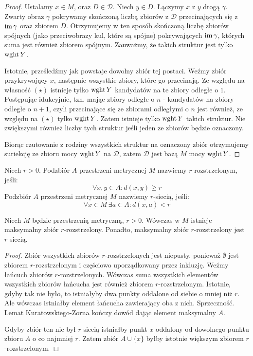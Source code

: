 \begin{lem}
\begin{proof}
    Ustalamy $x \in M$, oraz $D \in \mathcal D$. Niech $y \in D$. Łączymy $x$ z $y$ drogą $\gamma$. Zwarty obraz $\gamma$ pokrywamy skończoną liczbą zbiorów z $\mathcal D$ przecinających się z $\operatorname{im}\gamma$ oraz zbiorem $D$. Otrzymujemy w ten sposób skończoną liczbę zbiorów spójnych (jako przeciwobrazy kul, które są spójne) pokrywających $\operatorname{im}\gamma$, których suma jest również zbiorem spójnym. Zauważmy, że takich struktur jest tylko $\operatorname{wght} Y$. 
    
    Istotnie, prześledźmy jak powstaje dowolny zbiór tej postaci. Weźmy zbiór przykrywający $x$, następnie wszystkie zbiory, które go przecinają. Ze względu na własność $(\star)$ istnieje tylko $\operatorname{wght} Y$ kandydatów na te zbiory odległe o $1$. Postępując idukcyjnie, tzn. mając zbiory odległe o $n$ - kandydatów na zbiory odległe o $n+1$, czyli przecinające się ze zbiorami odległymi o $n$ jest również, ze względu na $(\star)$ tylko $\operatorname{wght} Y$. Zatem istnieje tylko $\operatorname{wght} Y$ takich struktur. Nie zwiększymi również liczby tych struktur jeśli jeden ze zbiorów będzie oznaczony.
    
    Biorąc rzutowanie z rodziny wszystkich struktur na oznaczony zbiór otrzymujemy suriekcję ze zbioru mocy $\operatorname{wght} Y$ na $\mathcal D$, zatem $\mathcal D$ jest bazą $M$ mocy $\operatorname{wght} Y$.
  \end{proof}
\end{lem}

\begin{df}
  Niech $r > 0$. Podzbiór $A$ przestrzeni metrycznej $M$ nazwiemy $r$-rozstrzelonym, jeśli:
  \[
    \forall x, y \in A: d(x,y) \geq r
  \]
  Podzbiór $A$ przestrzeni metrycznej $M$ nazwiemy $r$-siecią, jeśli:
  \[
    \forall x \in M\ \exists a \in A: d(x,a) < r
  \]
\end{df}

\begin{lem} \label{lem:anti-net}
  Niech $M$ będzie przestrzenią metryczną, $r > 0$. Wówczas w $M$ istnieje maksymalny zbiór $r$-rozstrzelony. Ponadto, maksymalny zbiór $r$-rozstrzelony jest $r$-siecią.
  \begin{proof}
    Zbiór wszystkich zbiorów $r$-rozstrzelonych jest niepusty, ponieważ $\emptyset$ jest zbiorem $r$-rozstrzelonym i częściowo uporządkowany przez inkluzję. Weźmy łańcuch zbiorów $r$-rozstrzelonych. Wówczas suma wszystkich elementów wszystkich zbiorów łańcucha jest również zbiorem $r$-rozstrzelonym. Istotnie, gdyby tak nie było, to istniałyby dwa punkty oddalone od siebie o mniej niż $r$. Ale wówczas istniałby element łańcucha zawierający oba z nich. Sprzeczność. Lemat Kuratowskiego-Zorna kończy dowód dając element maksymalny $A$.
    
    Gdyby zbiór ten nie był $r$-siecią istniałby punkt $x$ oddalony od dowolnego punktu zbioru $A$ o co najmniej $r$. Zatem zbiór $A \cup \{x\}$ byłby istotnie większym zbiorem $r$-rozstrzelonym.
  \end{proof}
\end{lem}

